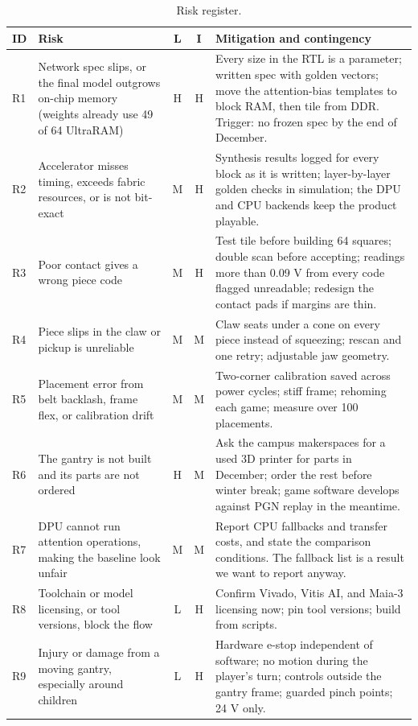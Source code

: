 \documentclass[10pt]{article}
\begin{document}
\begin{table}[H]
\centering\small
\caption{Risk register.}\label{tab:risk}
\begin{tabularx}{\textwidth}{@{}l P{3.9cm} c c L@{}}
\toprule
\textbf{ID} & \textbf{Risk} & \textbf{L} & \textbf{I} & \textbf{Mitigation and contingency} \\
\midrule
R1 & Network spec slips, or the final model outgrows on-chip memory (weights already use 49 of 64 UltraRAM) & H & H & Every size in the RTL is a parameter; written spec with golden vectors; move the attention-bias templates to block RAM, then tile from DDR. Trigger: no frozen spec by the end of December. \\
R2 & Accelerator misses timing, exceeds fabric resources, or is not bit-exact & M & H & Synthesis results logged for every block as it is written; layer-by-layer golden checks in simulation; the DPU and CPU backends keep the product playable. \\
R3 & Poor contact gives a wrong piece code & M & H & Test tile before building 64 squares; double scan before accepting; readings more than 0.09 V from every code flagged unreadable; redesign the contact pads if margins are thin. \\
R4 & Piece slips in the claw or pickup is unreliable & M & M & Claw seats under a cone on every piece instead of squeezing; rescan and one retry; adjustable jaw geometry. \\
R5 & Placement error from belt backlash, frame flex, or calibration drift & M & M & Two-corner calibration saved across power cycles; stiff frame; rehoming each game; measure over 100 placements. \\
R6 & The gantry is not built and its parts are not ordered & H & M & Ask the campus makerspaces for a used 3D printer for parts in December; order the rest before winter break; game software develops against PGN replay in the meantime. \\
R7 & DPU cannot run attention operations, making the baseline look unfair & M & M & Report CPU fallbacks and transfer costs, and state the comparison conditions. The fallback list is a result we want to report anyway. \\
R8 & Toolchain or model licensing, or tool versions, block the flow & L & H & Confirm Vivado, Vitis AI, and Maia-3 licensing now; pin tool versions; build from scripts. \\
R9 & Injury or damage from a moving gantry, especially around children & L & H & Hardware e-stop independent of software; no motion during the player's turn; controls outside the gantry frame; guarded pinch points; 24 V only. \\

\end{tabularx}
\end{table}
\end{document}
